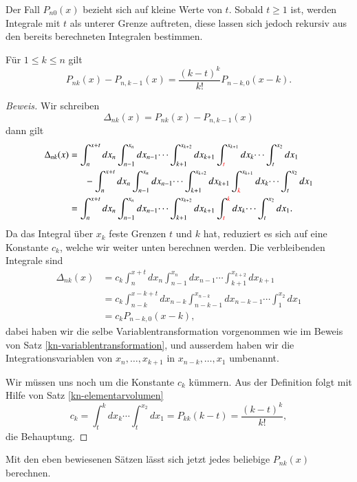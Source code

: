 Der Fall $P_{n0}(x)$ bezieht sich auf kleine Werte von $t$.
Sobald 
$t\ge 1$ ist, werden Integrale mit $t$ als unterer Grenze auftreten,
diese lassen sich jedoch rekursiv aus den bereits berechneten
Integralen bestimmen.

\begin{satz}\label{kn-rekursion}
Für $1\le k\le n$ gilt
\begin{equation}
P_{nk}(x)-P_{n,k-1}(x)
=
\frac{(k-t)^k}{k!}P_{n-k,0}(x-k).
\end{equation}
\end{satz}

\begin{proof}[Beweis]
Wir schreiben
\[
\Delta_{nk}(x)= P_{nk}(x)-P_{n,k-1}(x)
\]
dann gilt
\begin{align*}
\Delta_{nk}(x)
&=
\int_n^{x+t}dx_n\int_{n-1}^{x_n}dx_{n-1}\dotsi\int_{k+1}^{x_{k+2}}dx_{k+1}
\int^{x_{k+1}}_{\color{red}t} dx_k\dotsi\int_t^{x_2}dx_1
\\
&\phantom{=}\quad-\int_n^{x+t} dx_n\int_{n-1}^{x_n}dx_{n-1}\dotsi\int_{k+1}^{x_{k+2}}dx_{k+1}
\int^{x_{k+1}}_{\color{red}k} dx_k\dotsi\int_t^{x_2}dx_1
\\
&=
\int_n^{x+t}dx_n\int_{n-1}^{x_n}dx_{n-1}\dotsi\int_{k+1}^{x_{k+2}}dx_{k+1}
\int_{{\color{red}t\mathstrut}}^{\color{red}k}dx_k\dotsi\int_t^{x_2}dx_1.
\end{align*}
Da das Integral über $x_k$ feste Grenzen $t$ und $k$ hat, reduziert es
sich auf eine Konstante $c_k$, welche wir weiter unten berechnen werden.
Die verbleibenden Integrale sind
\begin{align*}
\Delta_{nk}(x)
&=
c_k\int_n^{x+t}dx_n\int_{n-1}^{x_n}dx_{n-1}\dotsi\int_{k+1}^{x_{k+2}}dx_{k+1}
\\
&=
c_k\int_{n-k}^{x-k+t}dx_{n-k}\int_{n-k-1}^{x_{n-k}}dx_{n-k-1}\dotsi\int_1^{x_2}dx_1
\\
&=c_kP_{n-k,0}(x-k),
\end{align*}
dabei haben wir die selbe Variablentransformation vorgenommen wie im
Beweis von Satz \ref{kn-variablentransformation}, und ausserdem haben
wir die Integrationsvariablen von $x_n,\dots,x_{k+1}$ in $x_{n-k},\dots,x_1$
umbenannt.

Wir müssen uns noch um die Konstante $c_k$ kümmern.
Aus der Definition folgt mit Hilfe von Satz \ref{kn-elementarvolumen}
\begin{equation}
c_k = \int_{t}^{k}dx_k\dotsi\int_t^{x_2}dx_1=P_{kk}(k-t)=\frac{(k-t)^k}{k!},
\end{equation}
die Behauptung.
\end{proof}
Mit den eben bewiesenen Sätzen lässt sich jetzt jedes beliebige 
$P_{nk}(x)$ berechnen.

